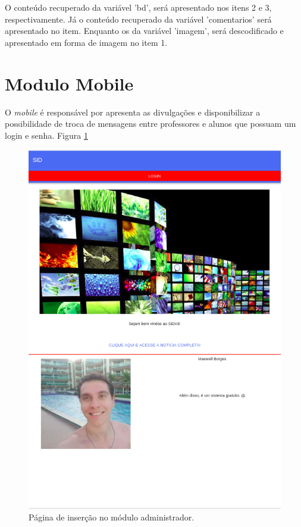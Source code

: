 O conteúdo recuperado da variável 'bd', será apresentado nos itens 2 e 3, respectivamente. Já o conteúdo recuperado da variável 'comentarios' será apresentado no item. Enquanto os da variável 'imagem', será descodificado e apresentado em forma de imagem no item 1.



\section{Modulo Mobile}
O \textit{mobile} é responsável por apresenta as divulgações e disponibilizar a possibilidade de troca de mensagens entre professores e alunos que possuam um login e senha. 
Figura \ref{fig:mobile1}

 
\begin{figure}[H]
\centering
\includegraphics[scale=0.6]{figuras/mobile1}
\caption{Página de inserção no módulo administrador.}
\label{fig:mobile1}
\end{figure}

